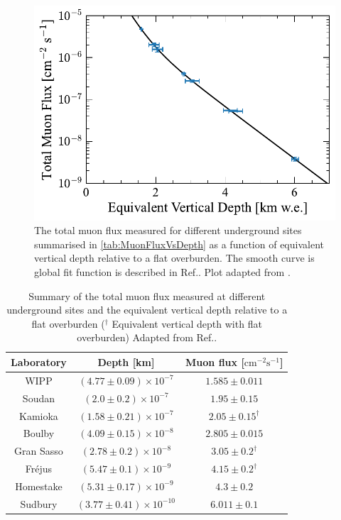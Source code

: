\begin{figure}[ht!]
    \centering
    \includegraphics[width=0.7\linewidth]{figures/Muons/Flux_Depth_Plot.pdf}
    \caption{The total muon flux measured for different underground sites summarised in \autoref{tab:MuonFluxVsDepth} as a function of equivalent vertical depth relative to a flat overburden. The smooth curve is global fit function is described in Ref.\cite{mei}. Plot adapted from \cite{mei}.}
    \label{fig:MuonFluxVsDepth}
\end{figure}
\begin{table}[ht!]
    \centering
    \begin{tabular}{|c|c|c|}
        \hline
        Laboratory & Depth [km] & Muon flux [$\text{cm}^{-2}\text{s}^{-1}$]\\
        \hline
         WIPP & $(4.77\pm0.09)\times10^{-7}$ & $1.585\pm0.011$\\
         Soudan & $(2.0\pm0.2)\times10^{-7}$ & $1.95\pm0.15$\\
         Kamioka & $(1.58\pm0.21)\times10^{-7}$ & $2.05\pm0.15^\dagger$\\
         Boulby & $(4.09\pm0.15)\times10^{-8}$ & $2.805\pm0.015$\\
         Gran Sasso & $(2.78\pm0.2)\times10^{-8}$ & $3.05\pm0.2^\dagger$\\
         Fr\'ejus & $(5.47\pm0.1)\times10^{-9}$ & $4.15\pm0.2^\dagger$\\
         Homestake & $(5.31\pm0.17)\times10^{-9}$ & $4.3\pm0.2$\\
         Sudbury & $(3.77\pm0.41)\times10^{-10}$ & $6.011\pm0.1$\\
         \hline
    \end{tabular}
    \caption{Summary of the total muon flux measured at different underground sites and the equivalent vertical depth relative to a flat overburden ($^\dagger$ Equivalent vertical depth with flat overburden) Adapted from Ref.\cite{mei}.}
    \label{tab:MuonFluxVsDepth}
\end{table}

